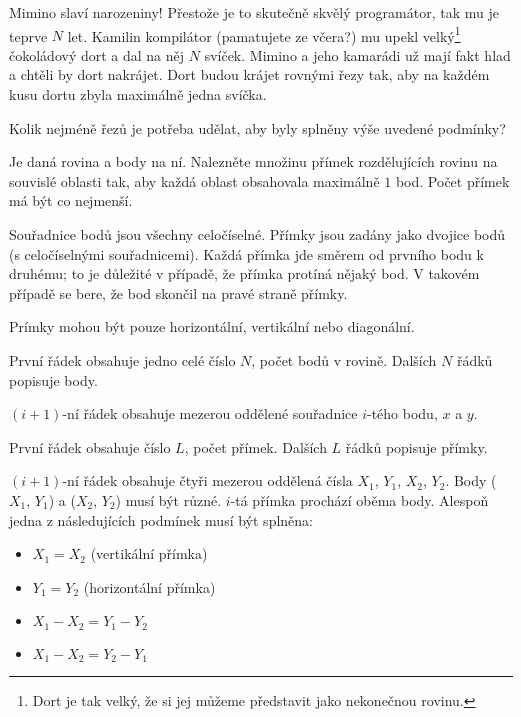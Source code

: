 





Mimino slaví narozeniny!
Přestože je to skutečně skvělý programátor, tak mu je teprve $N$ let.
Kamilin kompilátor (pamatujete ze včera?) mu upekl velký\footnote{Dort je tak velký, že si jej můžeme představit jako nekonečnou rovinu.}
čokoládový dort a dal na něj $N$ svíček.
Mimino a jeho kamarádi už mají fakt hlad a chtěli by dort nakrájet.
Dort budou krájet rovnými řezy tak, aby na každém kusu dortu zbyla maximálně jedna svíčka.

Kolik nejméně řezů je potřeba udělat, aby byly splněny výše uvedené podmínky?


Je daná rovina a body na ní. Nalezněte množinu přímek rozdělujících rovinu na souvislé oblasti tak, aby každá oblast obsahovala maximálně $1$ bod.
Počet přímek má být co nejmenší.

Souřadnice bodů jsou všechny celočíselné.
Přímky jsou zadány jako dvojice bodů (s celočíselnými souřadnicemi).
Každá přímka jde směrem od prvního bodu k druhému; to je důležité v případě, že přímka protíná nějaký bod. V takovém případě se bere, že bod skončil na pravé straně přímky.

Prímky mohou být pouze horizontální, vertikální nebo diagonální.


První řádek obsahuje jedno celé číslo $N$, počet bodů v rovině.
Dalších $N$ řádků popisuje body.

$(i+1)$-ní řádek obsahuje mezerou oddělené souřadnice $i$-tého bodu, $x$ a $y$.


První řádek obsahuje číslo $L$, počet přímek.
Dalších $L$ řádků popisuje přímky.

$(i+1)$-ní řádek obsahuje čtyři mezerou oddělená čísla $X_1$, $Y_1$, $X_2$, $Y_2$. Body ($X_1$, $Y_1$) a ($X_2$, $Y_2$) musí být různé. $i$-tá přímka prochází oběma body. Alespoň jedna z následujících podmínek musí být splněna:

\begin{itemize}
  \item $X_1 = X_2$ (vertikální přímka)
  \item $Y_1 = Y_2$ (horizontální přímka)
  \item $X_1 - X_2 = Y_1 - Y_2$
  \item $X_1 - X_2 = Y_2 - Y_1$
\end{itemize}

